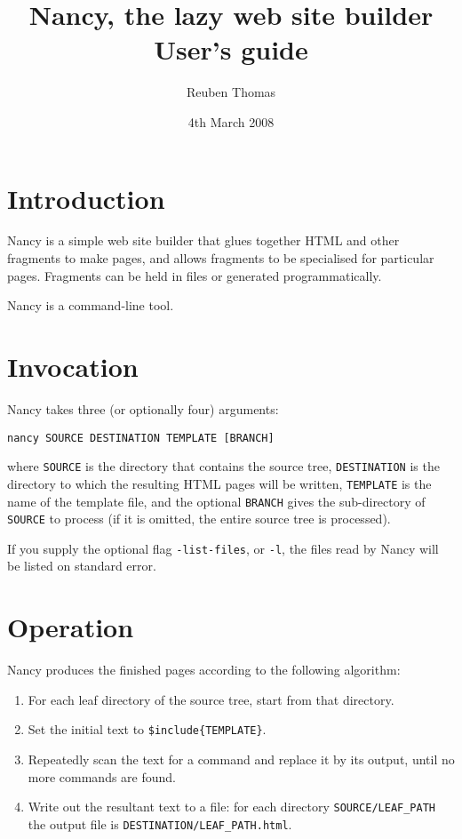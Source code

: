 \documentclass[english]{scrartcl}
\begin{document}
\title{Nancy, the lazy web site builder\\User's guide}
\date{4th March 2008}
\author{Reuben Thomas}
\maketitle

\section{Introduction}

Nancy is a simple web site builder that glues together HTML and other fragments to make pages, and allows fragments to be specialised for particular pages. Fragments can be held in files or generated programmatically.

Nancy is a command-line tool.

\section{Invocation}

Nancy takes three (or optionally four) arguments:

\begin{verbatim}
nancy SOURCE DESTINATION TEMPLATE [BRANCH]
\end{verbatim}

\noindent where \verb|SOURCE| is the directory that contains the source tree, \verb|DESTINATION| is the directory to which the resulting HTML pages will be written, \verb|TEMPLATE| is the name of the template file, and the optional \verb|BRANCH| gives the sub-directory of \verb|SOURCE| to process (if it is omitted, the entire source tree is processed).

If you supply the optional flag \verb|-list-files|, or \verb|-l|, the files read by Nancy will be listed on standard error.

\section{Operation}
\label{operation}

Nancy produces the finished pages according to the following algorithm:

\begin{enumerate}
\item For each leaf directory of the source tree, start from that directory.
\item Set the initial text to \verb|$include{TEMPLATE}|.
\item Repeatedly scan the text for a command and replace it by its output, until no more commands are found.
\item Write out the resultant text to a file: for each directory \verb|SOURCE/LEAF_PATH| the output file is \verb|DESTINATION/LEAF_PATH.html|.
\end{enumerate}
\end{document}

